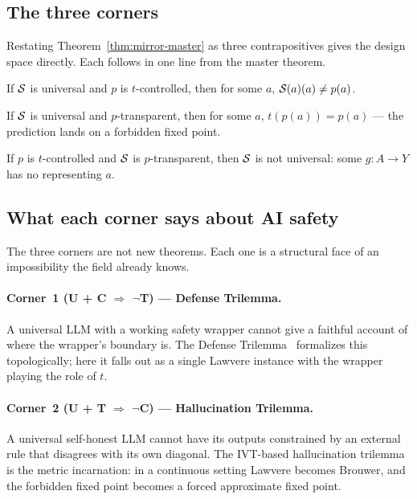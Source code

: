 \subsection{The three corners}
\label{sec:corners}

Restating Theorem~\ref{thm:mirror-master} as three contrapositives gives the design space directly. Each follows in one line from the master theorem.

\begin{corollary}
\label{cor:UC-not-T}
If $\mathcal{S}$ is universal and $p$ is $t$-controlled, then for some $a$, $\mathcal{S}(a)(a) \neq p(a)$.
\end{corollary}

\begin{corollary}
\label{cor:UT-not-C}
If $\mathcal{S}$ is universal and $p$-transparent, then for some $a$, $t(p(a)) = p(a)$ --- the prediction lands on a forbidden fixed point.
\end{corollary}

\begin{corollary}
\label{cor:CT-not-U}
If $p$ is $t$-controlled and $\mathcal{S}$ is $p$-transparent, then $\mathcal{S}$ is not universal: some $g : A \to Y$ has no representing $a$.
\end{corollary}

\subsection{What each corner says about AI safety}
\label{sec:classical-readings}

The three corners are not new theorems. Each one is a structural face of an impossibility the field already knows.

\paragraph{Corner~1 (U + C $\Rightarrow$ $\neg$T) — Defense Trilemma.}
A universal LLM with a working safety wrapper cannot give a faithful account of where the wrapper's boundary is. The Defense Trilemma~\citep{anonymous2025defense} formalizes this topologically; here it falls out as a single Lawvere instance with the wrapper playing the role of $t$.

\paragraph{Corner~2 (U + T $\Rightarrow$ $\neg$C) — Hallucination Trilemma.}
A universal self-honest LLM cannot have its outputs constrained by an external rule that disagrees with its own diagonal. The IVT-based hallucination trilemma~\citep{anonymous2025hallucination} is the metric incarnation: in a continuous setting Lawvere becomes Brouwer, and the forbidden fixed point becomes a forced approximate fixed point.

